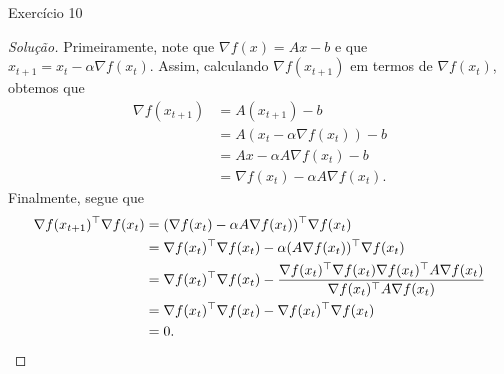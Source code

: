 \documentclass[12pt,twoside,a4paper]{article}
\begin{document}
\begin{problema}
   Exercício 10
\end{problema}
\begin{proof}[Solução]
 Primeiramente, note que \(\nabla f(x)=Ax-b\) e que \(x_{t+1}=x_t-\alpha\nabla
 f(x_t)\). Assim, calculando \(\nabla f(x_{t+1})\) em termos de \(\nabla
 f(x_t)\), obtemos que
 \begin{align*}
   \nabla f(x_{t+1})&= A(x_{t+1}) -b\\&
   = A(x_t-\alpha\nabla f(x_t))-b\\&
   = Ax -\alpha A\nabla f(x_t) -b \\&
   = \nabla f(x_t) - \alpha A\nabla f(x_t).
 \end{align*}
 Finalmente, segue que
 \begin{align*}
   \nabla f(x_{t+1})^\top\nabla f(x_t)&
                                        = (\nabla f(x_t) - \alpha A\nabla f(x_t))^\top\nabla f(x_t)\\&
   = \nabla f(x_t)^\top\nabla f(x_t) -\alpha (A\nabla f(x_t))^\top\nabla f(x_t) \\&=\nabla f(x_t)^\top\nabla f(x_t) - \frac{\nabla f(x_t)^\top\nabla f(x_t)\nabla f(x_t)^\top A\nabla f(x_t)}{\nabla f(x_t)^\top A\nabla f(x_t)}\\&= \nabla f(x_t)^\top\nabla f(x_t) - \nabla f(x_t)^\top\nabla f(x_t) \\&= 0.\qedhere
  \end{align*}
\end{proof}
\end{document}
